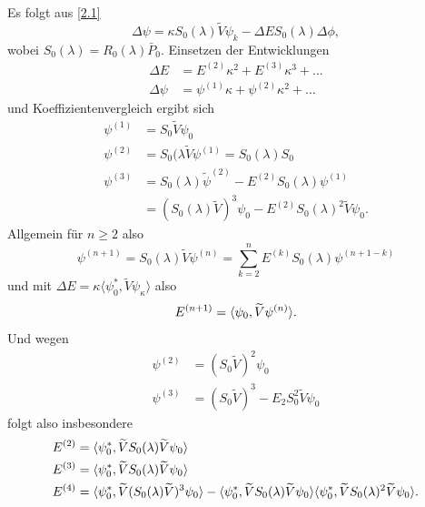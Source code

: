 \documentclass{mycourse}
\begin{document}
\begin{seg}
Es folgt aus \eqref{2.1}
\[
\Delta \psi = \kappa S_0(\lambda) \tilde V \psi_k - \Delta E S_0(\lambda) \Delta \phi,
\]
wobei $S_0(\lambda)=R_0(\lambda) \bar P_0$. Einsetzen der Entwicklungen 
\begin{align*}
\Delta E &= E^{(2)} \kappa^2 + E^{(3)} \kappa^3 + \ldots \\
\Delta \psi &= \psi^{(1)} \kappa + \psi^{(2)} \kappa^2 + \ldots
\end{align*}
und Koeffizientenvergleich ergibt sich
\begin{align*}
\psi^{(1)} &= S_0 \tilde V \psi_0\\
\psi^{(2)} &= S_0(\lambda \tilde V \psi^(1) =S_0(\lambda) S_0 \\
\psi^{(3)} &= S_0(\lambda) \tilde \psi^{(2)} - E^{(2)} S_0(\lambda) \psi^{(1)}\\
&=  (S_0(\lambda) \tilde V)^3 \psi_0 - E^{(2)} S_0(\lambda)^2 \tilde V \psi_0.
\end{align*}
Allgemein für $n\ge 2$ also
\[
\psi^{(n+1)}= S_0(\lambda) \tilde V \psi^{(n)} = \sum_{k=2}^n E^{(k)} S_0(\lambda) \psi^{(n+1-k)}
\]
und mit $\Delta E= \kappa \langle \psi_0^*, \tilde {V} \psi_\kappa\rangle$ also 
\[
E^{(n+1)}= \langle \psi_0, \widetilde V \psi^{(n)}\rangle.
\] 
Und wegen
\begin{align*}
\psi^{(2)} &= (S_0 \tilde V)^2 \psi_0\\
\psi^{(3)} &= (S_0 \tilde V)^3 - E_2 S_0^2 \tilde V \psi_0
\end{align*}
folgt also insbesondere
\begin{align*}
E^{(2)} &=  \langle \psi_0^*, \widetilde V S_0(\lambda) \widetilde V \psi_0\rangle\\
E^{(3)} &= \langle \psi_0^*, \widetilde V S_0(\lambda) \widetilde V \psi_0\rangle \\
E^{(4)} &= \langle \psi_0^*, \widetilde V (S_0(\lambda) \widetilde V)^3 \psi_0\rangle - \langle \psi_0^*, \widetilde V S_0(\lambda) \widetilde V \psi_0\rangle \langle \psi_0^*, \widetilde V S_0(\lambda)^2 \widetilde V \psi_0\rangle.
\end{align*}
\end{seg}
\end{document}
